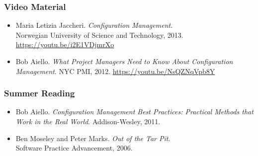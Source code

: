 \begin{frame}

\frametitle{Video Material}

\footnotesize

\begin{itemize}

\item Maria Letizia Jaccheri. \emph{Configuration Management}. \\ Norwegian
University of Science and Technology, 2013. \url{https://youtu.be/i2E1VDjmrXo}

\item Bob Aiello. \emph{What Project Managers Need to Know About Configuration
Management}. NYC PMI, 2012. \url{https://youtu.be/NsQZNqVpb8Y}

\end{itemize}

\end{frame}


\begin{frame}

\frametitle{Summer Reading}

\footnotesize

\begin{itemize}

\item Bob Aiello. \emph{Configuration Management Best Practices: Practical
Methods that Work in the Real World}. Addison-Wesley, 2011.

\item Ben Moseley and Peter Marks. \emph{Out of the Tar Pit}. \\ Software
Practice Advancement, 2006.

\end{itemize}

\end{frame}
